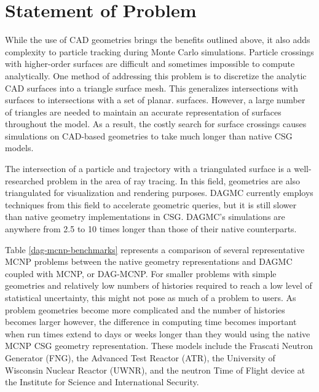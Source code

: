 \section{Statement of Problem}\label{sec:problem-statement}

While the use of CAD geometries brings the benefits outlined above, it also adds
complexity to particle tracking during Monte Carlo simulations. Particle
crossings with higher-order surfaces are difficult and sometimes impossible to
compute analytically. One method of addressing this problem is to discretize the
analytic CAD surfaces into a triangle surface mesh. This generalizes
intersections with surfaces to intersections with a set of planar.
surfaces. However, a large number of triangles are needed to maintain an
accurate representation of surfaces throughout the model. As a result, the
costly search for surface crossings causes simulations on CAD-based geometries
to take much longer than native CSG models.

The intersection of a particle and trajectory with a triangulated surface is a
well-researched problem in the area of ray tracing. In this field, geometries
are also triangulated for visualization and rendering purposes. DAGMC currently
employs techniques from this field to accelerate geometric queries, but it is
still slower than native geometry implementations in CSG. DAGMC's simulations
are anywhere from 2.5 to 10 times longer than those of their native
counterparts.

Table \ref{dag-mcnp-benchmarks} represents a comparison of several
representative MCNP problems between the native geometry representations and
DAGMC coupled with MCNP, or DAG-MCNP. For smaller problems with simple
geometries and relatively low numbers of histories required to reach a low level
of statistical uncertainty, this might not pose as much of a problem to
users. As problem geometries become more complicated and the number of histories
becomes larger however, the difference in computing time becomes important when
run times extend to days or weeks longer than they would using the native MCNP
CSG geometry representation. These models include the Frascati Neutron Generator
(FNG), the Advanced Test Reactor (ATR), the University of Wisconsin Nuclear
Reactor (UWNR), and the neutron Time of Flight device at the Institute for
Science and International Security.

